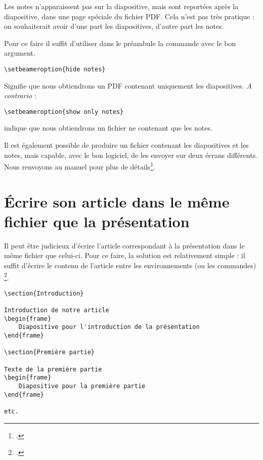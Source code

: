 Les notes n'apparaissent pas sur la diapositive, mais sont reportées après la diapositive, dans une page spéciale du fichier PDF. Cela n'est pas très pratique : on souhaiterait avoir d'une part les diapositives, d'autre part les notes. 

Pour ce faire il suffit d'utiliser dans le préambule la commande  avec le bon argument.

\begin{verbatim}
\setbeameroption{hide notes}
\end{verbatim}

Signifie que nous obtiendrons un PDF contenant uniquement les diapositives. \emph{A contrario} :
\begin{verbatim}
\setbeameroption{show only notes}
\end{verbatim}
indique que nous obtiendrons un fichier ne contenant que les notes.

Il est également possible de produire un fichier contenant les diapositives et les notes, mais capable, avec le bon logiciel, de les envoyer sur deux écrans différents. Nous renvoyons au manuel pour plus de détails\footcite{beamer_2ecrans}.

\section{Écrire son article dans le même fichier que la présentation}

Il peut être judicieux d'écrire l'article correspondant à la présentation dans le même fichier que celui-ci. Pour ce faire, la solution est relativement simple : il suffit d'écrire le contenu de l'article entre les environnements (ou les commandes) \footcites[À noter qu'on peut aussi introduire des miniatures des diapositives  dans l'article, voir :][]{beamer_diapo_article}.

\begin{verbatim}
\section{Introduction}

Introduction de notre article
\begin{frame}
	Diapositive pour l'introduction de la présentation
\end{frame}

\section{Première partie}

Texte de la première partie
\begin{frame}
	Diapositive pour la première partie
\end{frame}

etc.
\end{verbatim}

